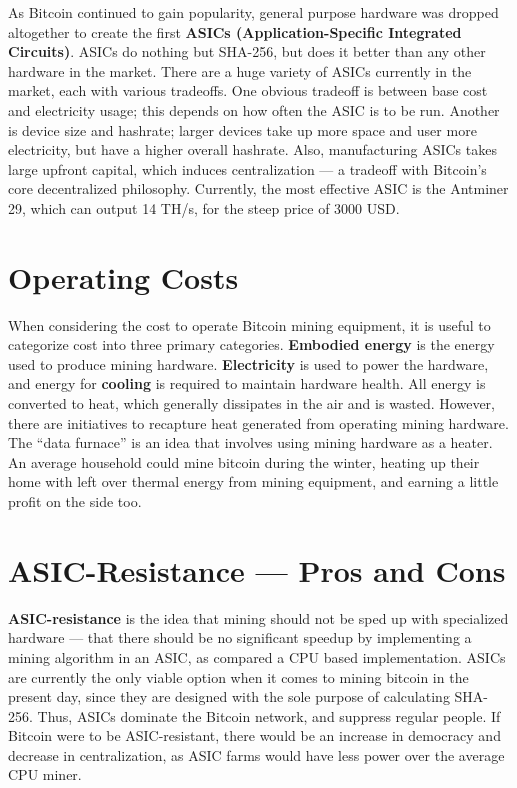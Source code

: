 \documentclass[11pt]{article}
\begin{document}
    As Bitcoin continued to gain popularity, general purpose hardware was dropped altogether to create the first \textbf{ASICs (Application-Specific Integrated Circuits)}. ASICs do nothing but SHA-256, but does it better than any other hardware in the market. There are a huge variety of ASICs currently in the market, each with various tradeoffs. One obvious tradeoff is between base cost and electricity usage; this depends on how often the ASIC is to be run. Another is device size and hashrate; larger devices take up more space and user more electricity, but have a higher overall hashrate. Also, manufacturing ASICs takes large upfront capital, which induces centralization --- a tradeoff with Bitcoin's core decentralized philosophy. Currently, the most effective ASIC is the Antminer 29, which can output 14 TH/s, for the steep price of 3000 USD.
    
    \section*{Operating Costs}
    
    When considering the cost to operate Bitcoin mining equipment, it is useful to categorize cost into three primary categories. \textbf{Embodied energy} is the energy used to produce mining hardware. \textbf{Electricity} is used to power the hardware, and energy for \textbf{cooling} is required to maintain hardware health. All energy is converted to heat, which generally dissipates in the air and is wasted. However, there are initiatives to recapture heat generated from operating mining hardware. The ``data furnace'' is an idea that involves using mining hardware as a heater. An average household could mine bitcoin during the winter, heating up their home with left over thermal energy from mining equipment, and earning a little profit on the side too. 
    
    \section*{ASIC-Resistance --- Pros and Cons}
    
    \textbf{ASIC-resistance} is the idea that mining should not be sped up with specialized hardware --- that there should be no significant speedup by implementing a mining algorithm in an ASIC, as compared a CPU based implementation. ASICs are currently the only viable option when it comes to mining bitcoin in the present day, since they are designed with the sole purpose of calculating SHA-256. Thus, ASICs dominate the Bitcoin network, and suppress regular people. If Bitcoin were to be ASIC-resistant, there would be an increase in democracy and decrease in centralization, as ASIC farms would have less power over the average CPU miner.
    
\end{document}
